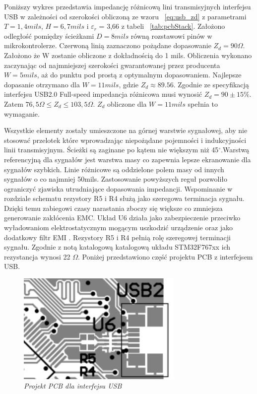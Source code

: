 \documentclass[eng,printmode]{mgr}
\begin{document}
Poniższy wykres przedstawia impedancję różnicową lini transmisyjnych interfejsu USB w zależności od szerokości obliczoną ze wzoru ~\ref{eq:usb_zd} z parametrami $T = 1,4 mils$, $H = 6,7 mils$ i \textbf{$\varepsilon_r$} = 3,66 z tabeli ~\ref{tab:pcbStack}. Założono odległość pomiędzy ścieżkami $ D = 8mils$ równą rozstawowi pinów w mikrokontrolerze. Czerwoną linią zaznaczono pożądane dopasowanie $Z_d = 90 \Omega$. Założono że W zostanie obliczone z dokładnością do 1 mils. Obliczenia wykonano zaczynając od najmniejszej szerokości gwarantowanej przez producenta $W = 5 mils$, aż do punktu pod prostą z optymalnym dopasowaniem. Najlepsze dopasanie otrzymano dla $W = 11 mils$, gdzie $Z_d \approx 89.56$. Zgodnie ze specyfikacją interfejsu USB2.0 Full-speed  impedancja różnicowa musi wynosić $Z_d = 90 \pm 15\%$.\cite{usbSpec} Zatem $ 76,5\Omega \leq Z_d \leq 103,5\Omega$. $Z_d$ obliczone dla $W = 11 mils$ spełnia to wymaganie.

Wszystkie elementy zostały umieszczone na górnej warstwie sygnałowej, aby nie stosować przelotek które wprowadzając niepożądane pojemności i indukcyjności linii transmisyjnym. Ścieżki są zaginane po kątem nie większym niż 45$^\circ$.Warstwą referencyjną dla sygnałów jest warstwa masy co zapewnia lepsze ekranowanie dla sygnałów szybkich. Linie różnicowe są oddzielone polem masy od innych sygnałów o co najmniej 50mils. Zastosowanie powyższych reguł pozwoliło ograniczyć zjawiska utrudniające dopasowania impedancji. Wspominanie w rozdziale schematu rezystory R5 i R4 służą jako szeregowa terminacja sygnału. Dzięki temu zabiegowi czasy narastania zboczy się większe co zmniejsza generowanie zakłócenia EMC. Układ U6 działa jako zabezpieczenie przeciwko wyładowaniom elektrostatycznym mogącym uszkodzić urządzenie oraz jako dodatkowy filtr EMI . Rezystory R5 i R4 pełnią rolę szeregowej terminacji sygnału. Zgodnie z notą katalogową katalogową układu STM32F767xx ich rezystancja wynosi 22 \textbf{$\Omega$}. Poniżej przedstawiono część projektu PCB z interfejsem USB.

\begin{figure}[!h]
    \centering
    \includegraphics[width=8cm]{pcb/usb.png}
    \caption{\textit{Projekt PCB dla interfejsu USB}}
\end{figure}
\end{document}
